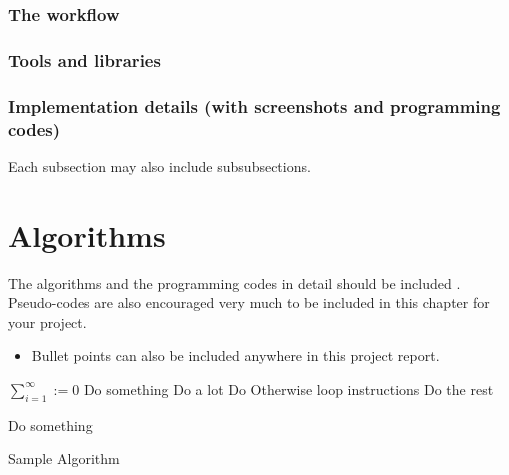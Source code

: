 \documentclass[12pt]{report}
\begin{document}
\subsubsection{The workflow}

\subsubsection{Tools and libraries}

\subsubsection{Implementation details (with screenshots and programming codes)}

Each subsection may also include subsubsections.


\section{Algorithms}
The algorithms and the programming codes in detail should be included .\\Pseudo-codes are also encouraged very much to be included in this chapter for your project.

\begin{itemize}
    \item Bullet points can also be included anywhere in this project report.
\end{itemize}


\begin{algorithm}[H]
\DontPrintSemicolon
  
  $\sum_{i=1}^{\infty} := 0$ 
    {
        Do something    
        {Do a lot}
    }
    {
    	Do Otherwise \;
        { 
        	loop instructions
        }
    }
    \Else
    {
    	Do the rest
    }
    
   {
   		Do something\;
   }

\caption{Sample Algorithm}
\end{algorithm}


\end{document}
